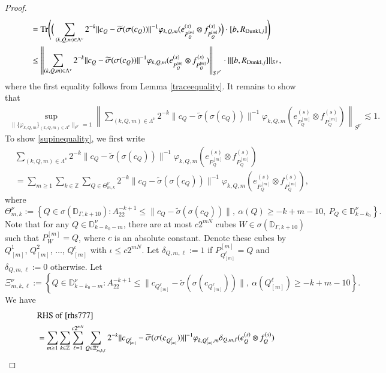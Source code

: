 \documentclass[12pt]{amsart}
\begin{document}
\begin{proof}
\begin{align}
&={\rm Tr}\Bigg(\Big(\sum_{(k,Q,m)\in\Lambda^\nu}2^{-k}\|c_Q-\widetilde{\sigma}(\sigma(c_Q))\|^{-1}\varphi_{k,Q,m} (e_{P_Q^{[m]}}^{(s)}\otimes f_{P_Q^{[m]}}^{(s)})\Big)\cdot [b,R_{{\rm Dunkl},j}]\Bigg)\nonumber\\
&\leq \left\|\sum_{(k,Q,m)\in\Lambda^\nu}2^{-k}\|c_Q-\widetilde{\sigma}(\sigma(c_Q))\|^{-1}\varphi_{k,Q,m} (e_{P_Q^{[m]}}^{(s)}\otimes f_{P_Q^{[m]}}^{(s)})\right\|_{S^{p'}}\cdot \|[b,R_{{\rm Dunkl},j}]\|_{S^p},
\end{align}
where the first equality follows from Lemma \ref{traceequality}.
It remains to show that
\begin{align}\label{supinequality}
\sup_{\|\{\varphi_{k,Q,m}\}_{(k,Q,m)\in\Lambda^\nu}\|_{\ell^{p'}}=1}\left\|\sum_{(k,Q,m)\in\Lambda^\nu}2^{-k}\|c_Q-\widetilde{\sigma}(\sigma(c_Q))\|^{-1}\varphi_{k,Q,m} (e_{P_Q^{[m]}}^{(s)}\otimes f_{P_Q^{[m]}}^{(s)})\right\|_{S^{p'}}\lesssim 1.
\end{align}
To show \eqref{supinequality}, we first write
\begin{align}\label{rhs777}
&\sum_{(k,Q,m)\in\Lambda^\nu}2^{-k}\|c_Q-\widetilde{\sigma}(\sigma(c_Q))\|^{-1}\varphi_{k,Q,m} (e_{P_Q^{[m]}}^{(s)}\otimes f_{P_Q^{[m]}}^{(s)})\nonumber\\
&=\sum_{m\geq 1}\sum_{k\in\mathbb{Z}}\sum_{Q\in \Theta_{m,k}^\nu}2^{-k}\|c_Q-\widetilde{\sigma}(\sigma(c_Q))\|^{-1}\varphi_{k,Q,m} (e_{P_Q^{[m]}}^{(s)}\otimes f_{P_Q^{[m]}}^{(s)}),
\end{align}
where
$$\Theta_{m,k}^\nu:=\left\{Q\in\sigma(\mathbb{D}_{\Gamma,k+10}):A_22^{-k+1}\leq \|c_Q-\widetilde{\sigma}(\sigma(c_Q))\|,\ \alpha(Q)\geq -k+m-10,\ P_Q\in\mathbb{D}_{k-k_0}^\nu\right\}.$$
Note that for any $Q\in \mathbb{D}_{k-k_0-m}^\nu$, there are at most $c2^{mN}$ cubes $W\in\sigma(\mathbb{D}_{\Gamma,k+10})$ such that $P_W^{[m]}=Q$, where $c$ is an absolute constant. Denote these cubes by $Q_{[m]}^{1}$, $Q_{[m]}^{2}$, $\ldots$, $Q_{[m]}^{\iota}$ with $\iota\leq c2^{mN}$. Let
$\delta_{Q,m,\ell}:=1$ if $P_{Q_{[m]}^\ell}^{[m]}=Q$ and $\delta_{Q,m,\ell}:=0$ otherwise. Let
$$\Xi_{m,k,\ell}^\nu:=\left\{Q\in \mathbb{D}_{k-k_0-m}^\nu: A_22^{-k+1}\leq \|c_{Q_{[m]}^\ell}-\widetilde{\sigma}(\sigma(c_{Q_{[m]}^\ell}))\|,\ \alpha({Q_{[m]}^\ell})\geq -k+m-10\right\}.$$
We have
\begin{align}\label{rhs888}
&{\rm RHS}\ {\rm of}\ \eqref{rhs777}\nonumber\\
&=\sum_{m\geq 1}\sum_{k\in\mathbb{Z}}\sum_{\ell=1}^{c2^{mN}}\sum_{Q\in \Xi_{m,k,\ell}^\nu}2^{-k}\|c_{Q_{[m]}^\ell}-\widetilde{\sigma}(\sigma(c_{Q_{[m]}^\ell}))\|^{-1}\varphi_{k,{Q_{[m]}^\ell},m}\delta_{Q,m,\ell} (e_Q^{(s)}\otimes f_Q^{(s)})\nonumber\\

\end{align}
\end{proof}
\end{document}
